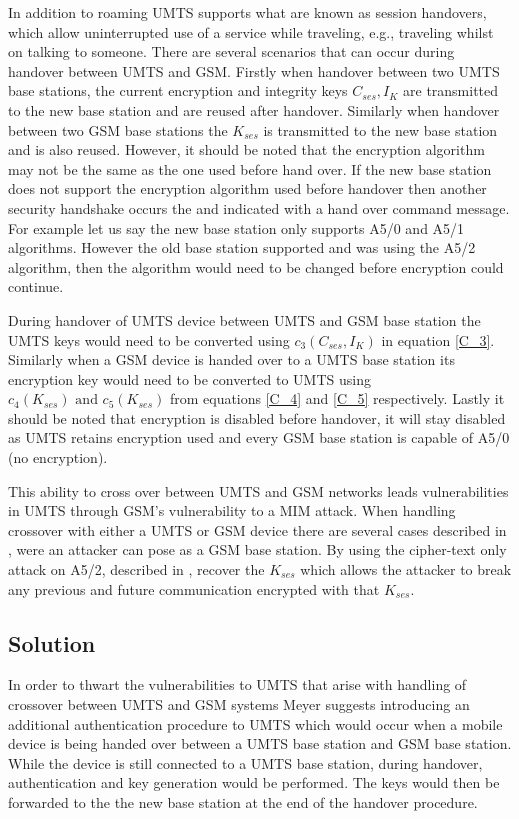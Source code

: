 \documentclass{sig-alternate}
\begin{document}
In addition to roaming UMTS supports what are known as session handovers, which allow uninterrupted use of a service while traveling, e.g., traveling whilst on talking to someone. There are several scenarios that can occur during handover between UMTS and GSM. Firstly when handover between two UMTS base stations, the current encryption and integrity keys $C_{ses},I_{K}$ are transmitted to the new base station and are reused after handover. Similarly when handover between two GSM base stations the $K_{ses}$ is transmitted to the new base station and is also reused. However, it should be noted that the encryption algorithm may not be the same as the one used before hand over. If the new base station does not support the encryption algorithm used before handover then another security handshake occurs the and indicated with a hand over command message. For example let us say the new base station only supports A5/0 and A5/1 algorithms. However the old base station supported and was using the A5/2 algorithm, then the algorithm would need to be changed before encryption could continue. 

 During handover of UMTS device between UMTS and GSM base station the UMTS keys would need to be converted using $c_{3}(C_{ses},I_{K})$ in equation \ref{C_3}. Similarly when a GSM device is handed over to a UMTS base station its encryption key would need to be converted to UMTS using $c_{4}(K_{ses}) \text{ and } c_{5}(K_{ses})$ from equations \ref{C_4} and \ref{C_5} respectively. Lastly it should be noted that encryption is disabled before handover, it will stay disabled as UMTS retains encryption used and every GSM base station is capable of A5/0 (no encryption).   
	
	This ability to cross over between UMTS and GSM networks leads vulnerabilities in UMTS through GSM's vulnerability to a MIM attack. When handling crossover with either a UMTS or GSM device there are several cases described in \cite{Meyer:2004}, were an attacker can pose as a GSM base station. By using the cipher-text only attack on A5/2, described in \cite{Barkan}, recover the $K_{ses}$ which allows the attacker to break any previous and future communication encrypted with that $K_{ses}$.   
	\subsection{Solution}
	In order to thwart the vulnerabilities to UMTS that arise with handling of crossover between UMTS and GSM systems Meyer \cite{Meyer:2004} suggests introducing an additional authentication procedure to UMTS which would occur when a mobile device is being handed over between a UMTS base station and GSM base station. While the device is still connected to a UMTS base station, during handover, authentication and key generation would be performed. The keys would then be forwarded to the the new base station at the end of the handover procedure.
		
\end{document}
